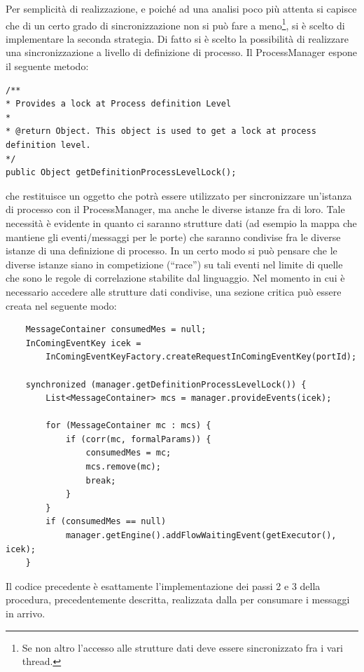 Per semplicità di realizzazione, e poiché ad una analisi poco più attenta si
capisce che di un certo grado di sincronizzazione non si può fare a
meno\footnote{Se non altro l'accesso alle strutture dati deve essere
sincronizzato fra i vari thread.}, si \`e scelto di implementare la seconda
strategia. Di fatto si \`e scelto la possibilità di realizzare una
sincronizzazione a livello di definizione di processo. Il ProcessManager espone
il seguente metodo:
\begin{lstlisting}
/**
* Provides a lock at Process definition Level
* 
* @return Object. This object is used to get a lock at process definition level.
*/
public Object getDefinitionProcessLevelLock();
\end{lstlisting}
che restituisce un oggetto che potrà essere utilizzato per sincronizzare
un'istanza di processo con il ProcessManager, ma anche le diverse istanze fra
di loro. Tale necessità \`e evidente in quanto ci saranno strutture dati (ad
esempio la mappa che mantiene gli eventi/messaggi per le porte) che saranno 
condivise fra le diverse istanze di una definizione di processo. In un certo
modo  si può pensare che le diverse istanze siano in competizione (``race'') su
tali eventi nel limite di quelle che sono le regole di correlazione stabilite
dal  linguaggio. Nel momento in cui è necessario accedere alle strutture dati
condivise, una sezione critica può essere creata nel seguente modo:
\begin{lstlisting}
   	MessageContainer consumedMes = null;
	InComingEventKey icek = 
		InComingEventKeyFactory.createRequestInComingEventKey(portId);

	synchronized (manager.getDefinitionProcessLevelLock()) {
		List<MessageContainer> mcs = manager.provideEvents(icek);

		for (MessageContainer mc : mcs) {
			if (corr(mc, formalParams)) {
				consumedMes = mc;
				mcs.remove(mc); 
				break;
			}
     	}
		if (consumedMes == null)
			manager.getEngine().addFlowWaitingEvent(getExecutor(), icek);
   	}
\end{lstlisting}

Il codice precedente è esattamente l'implementazione dei passi 2 e 3 della
procedura, precedentemente descritta, realizzata dalla 
per consumare i messaggi in arrivo.
\\

